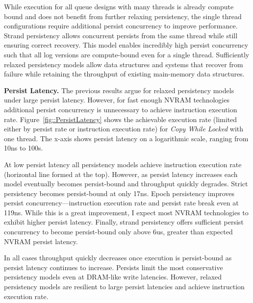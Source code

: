 While execution for all queue designs with many threads is already compute bound and does not benefit from further relaxing persistency, the single thread configurations require additional persist concurrency to improve performance.
Strand persistency allows concurrent persists from the same thread while still ensuring correct recovery.
This model enables incredibly high persist concurrency such that all log versions are compute-bound even for a single thread.
Sufficiently relaxed persistency models allow data structures and systems that recover from failure while retaining the throughput of existing main-memory data structures.

\textbf{Persist Latency.}
The previous results argue for relaxed persistency models under large persist latency.
However, for fast enough NVRAM technologies additional persist concurrency is unnecessary to achieve instruction execution rate.
Figure~\ref{fig::PersistLatency} shows the achievable execution rate (limited either by persist rate or instruction execution rate) for \emph{Copy While Locked} with one thread.
The x-axis shows persist latency on a logarithmic scale, ranging from 10ns to 100\textmu s.

%
 

At low persist latency all persistency models achieve instruction execution rate (horizontal line formed at the top).
However, as persist latency increases each model eventually becomes persist-bound and throughput quickly degrades.
Strict persistency becomes persist-bound at only 17ns.
Epoch persistency improves persist concurrency---instruction execution rate and persist rate break even at 119ns.
While this is a great improvement, I expect most NVRAM technologies to exhibit higher persist latency.
Finally, strand persistency offers sufficient persist concurrency to become persist-bound only above 6us, greater than expected NVRAM persist latency.

In all cases throughput quickly decreases once execution is persist-bound as persist latency continues to increase.
Persists limit the most conservative persistency models even at DRAM-like write latencies.
However, relaxed persistency models are resilient to large persist latencies and achieve instruction execution rate.

